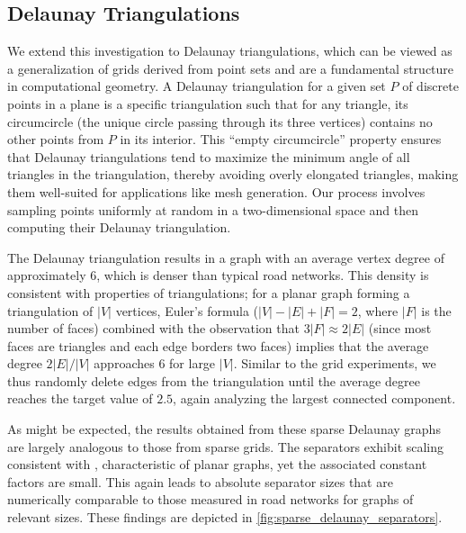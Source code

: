 \subsection{Delaunay Triangulations}
\label{sec:synthetic:delaunay}

We extend this investigation to Delaunay triangulations, which can be viewed as a generalization of grids derived from point sets and are a fundamental structure in computational geometry.
A Delaunay triangulation for a given set \(P\) of discrete points in a plane is a specific triangulation such that for any triangle, its circumcircle (the unique circle passing through its three vertices) contains no other points from \(P\) in its interior.
This \enquote{empty circumcircle} property ensures that Delaunay triangulations tend to maximize the minimum angle of all triangles in the triangulation, thereby avoiding overly elongated triangles, making them well-suited for applications like mesh generation.
Our process involves sampling points uniformly at random in a two-dimensional space and then computing their Delaunay triangulation.

The Delaunay triangulation results in a graph with an average vertex degree of approximately 6, which is denser than typical road networks.
This density is consistent with properties of triangulations; for a planar graph forming a triangulation of \(|V|\) vertices, Euler's formula (\(|V| - |E| + |F| = 2\), where \(|F|\) is the number of faces) combined with the observation that \(3|F| \approx 2|E|\) (since most faces are triangles and each edge borders two faces) implies that the average degree \(2|E|/|V|\) approaches 6 for large \(|V|\).
Similar to the grid experiments, we thus randomly delete edges from the triangulation until the average degree reaches the target value of \(2.5\), again analyzing the largest connected component.

As might be expected, the results obtained from these sparse Delaunay graphs are largely analogous to those from sparse grids.
The separators exhibit scaling consistent with , characteristic of planar graphs, yet the associated constant factors are small.
This again leads to absolute separator sizes that are numerically comparable to those measured in road networks for graphs of relevant sizes.
These findings are depicted in \cref{fig:sparse_delaunay_separators}.

